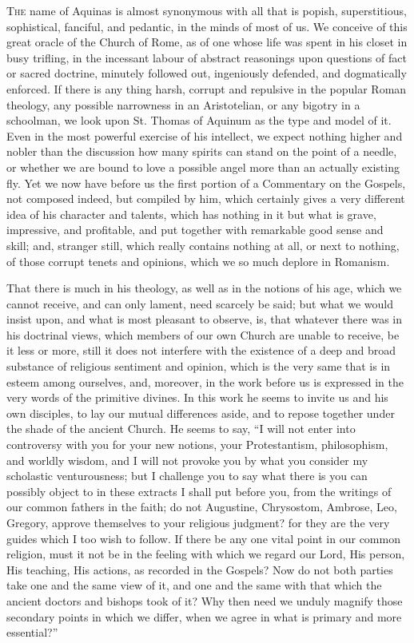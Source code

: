 T\textsc{he} name of Aquinas is
almost synonymous with all that is popish, superstitious, sophistical,
fanciful, and pedantic, in the minds of most of us. We conceive of this
great oracle of the Church of Rome, as of one whose life was spent in
his closet in busy trifling, in the incessant labour of abstract
reasonings upon questions of fact or sacred doctrine, minutely followed
out, ingeniously defended, and dogmatically enforced. If there is any
thing harsh, corrupt and repulsive in the popular Roman theology, any
possible narrowness in an Aristotelian, or any bigotry in a schoolman,
we look upon St. Thomas of Aquinum as the type and model of it. Even in
the most powerful exercise of his intellect, we expect nothing higher
and nobler than the discussion how many spirits can stand on the point
of a needle, or whether we are bound to love a possible angel more than
an actually existing fly. Yet we now have before us the first portion of
a Commentary on the Gospels, not composed indeed, but compiled by him,
which certainly gives a very different idea of his character and
talents, which has nothing in it but what is grave, impressive, and
profitable, and put together with remarkable good sense and skill; and,
stranger still, which really contains nothing at all, or next to
nothing, of those corrupt tenets and opinions, which we so much deplore
in Romanism.

That there is much in his theology, as well as in
the notions of his age, which we cannot receive, and can only lament,
need scarcely be said; but what we would insist upon, and what is most
pleasant to observe, is, that whatever there was in his doctrinal views,
which members of our own Church are unable to receive, be it less or
more, still it does not interfere with the existence of a deep and broad
substance of religious sentiment and opinion, which is the very same
that is in esteem among ourselves, and, moreover, in the work before us
is expressed in the very words of the primitive divines. In this work he
seems to invite us and his own disciples, to lay our mutual differences
aside, and to repose together under the shade of the ancient Church. He
seems to say, ``I will not enter into controversy with you for your new
notions, your Protestantism, philosophism, and worldly wisdom, and
I will not provoke you by what you consider my scholastic venturousness;
but I challenge you to say what there is you can possibly object to in
these extracts I shall put before you, from the writings of our common
fathers in the faith; do not Augustine, Chrysostom, Ambrose, Leo,
Gregory, approve themselves to your religious judgment? for they are the
very guides which I too wish to follow. If there be any one vital point
in our common religion, must it not be in the feeling with which we
regard our Lord, His person, His teaching, His actions, as recorded in
the Gospels? Now do not both parties take one and the same view of it,
and one and the same with that which the ancient doctors and bishops
took of it? Why then need we unduly magnify those secondary points in
which we differ, when we agree in what is primary and more essential?''

